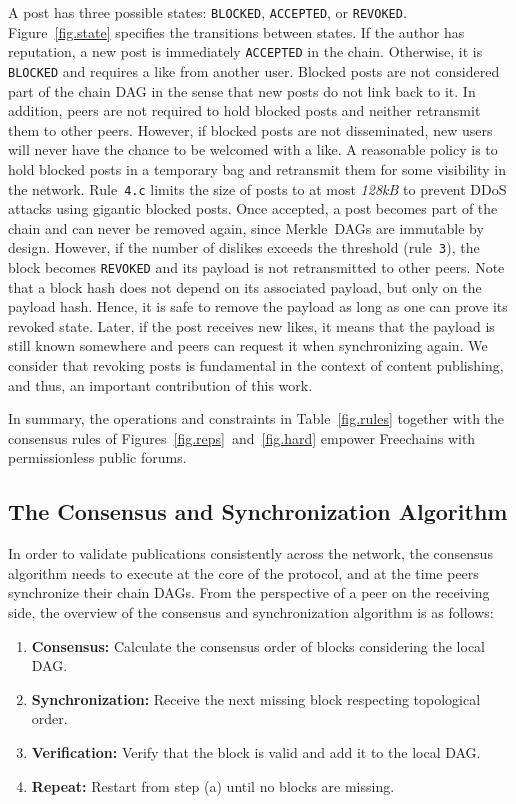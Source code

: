\documentclass[12pt]{article}
\newcommand{\FC}       {Freechains\xspace}
\newcommand{\code}[1]  {\texttt{\footnotesize{#1}}}
\begin{document}
A post has three possible states: \code{BLOCKED}, \code{ACCEPTED}, or
\code{REVOKED}.
Figure~\ref{fig.state} specifies the transitions between states.
%
If the author has reputation, a new post is immediately \code{ACCEPTED} in the
chain.
%
Otherwise, it is \code{BLOCKED} and requires a like from another user.
Blocked posts are not considered part of the chain DAG in the sense that new
posts do not link back to it.
In addition, peers are not required to hold blocked posts and neither
retransmit them to other peers.
However, if blocked posts are not disseminated, new users will never have the
chance to be welcomed with a like.
A reasonable policy is to hold blocked posts in a temporary bag and retransmit
them for some visibility in the network.
Rule~\code{4.c} limits the size of posts to at most \emph{128kB} to prevent
DDoS attacks using gigantic blocked posts.
%
Once accepted, a post becomes part of the chain and can never be removed
again, since Merkle~DAGs are immutable by design.
%
However, if the number of dislikes exceeds the threshold (rule~\code{3}), the
block becomes \code{REVOKED} and its payload is not retransmitted to other
peers.
Note that a block hash does not depend on its associated payload, but only on
the payload hash.
Hence, it is safe to remove the payload as long as one can prove its revoked
state.
Later, if the post receives new likes, it means that the payload is still known
somewhere and peers can request it when synchronizing again.
We consider that revoking posts is fundamental in the context of content
publishing, and thus, an important contribution of this work.

In summary, the operations and constraints in Table~\ref{fig.rules} together
with the consensus rules of Figures~\ref{fig.reps}~and~\ref{fig.hard} empower
\FC with permissionless public forums.

\subsection{The Consensus and Synchronization Algorithm}
\label{sec.consensus.algo}

In order to validate publications consistently across the network, the
consensus algorithm needs to execute at the core of the protocol, and at the
time peers synchronize their chain DAGs.
From the perspective of a peer on the receiving side, the overview of the
consensus and synchronization algorithm is as follows:
\begin{enumerate}
\item \textbf{Consensus:}
    Calculate the consensus order of blocks considering the local DAG.
\item \textbf{Synchronization:}
    Receive the next missing block respecting topological order.
\item \textbf{Verification:}
    Verify that the block is valid and add it to the local DAG.
\item \textbf{Repeat:}
    Restart from step (a) until no blocks are missing.
\end{enumerate}
\end{document}
